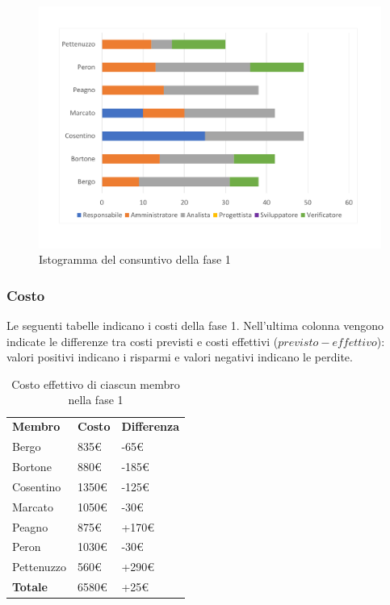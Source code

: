 	\begin{figure}[H]
		\centering
		\includegraphics[scale=0.45]{images/consuntivoRR.pdf}
		\caption{Istogramma del consuntivo della fase 1}
	\end{figure}
	
	\subsubsection{Costo}
	Le seguenti tabelle indicano i costi della fase 1. Nell'ultima colonna vengono indicate le differenze tra costi previsti e costi effettivi ($previsto - effettivo$): valori positivi indicano i risparmi e valori negativi indicano le perdite.
	
	\begin{table}[H]
		\centering
		\begin{tabular}{| l | l | l |}
			\rowcolor{LightBlue}
			\textbf{\color{white}Membro}
			& \textbf{\color{white}Costo}
			& \textbf{\color{white}Differenza}\\			
			Bergo 				& 835€ 	& -65€\\
			Bortone 			& 880€ 	& -185€\\
			Cosentino 		& 1350€ 	& -125€\\
			Marcato 			& 1050€ 	& -30€\\
			Peagno 			& 875€ 	& +170€\\
			Peron 				& 1030€ 	& -30€\\
			Pettenuzzo 	& 560€ 	& +290€\\ \hline
			\textbf{Totale} & 6580€ & +25€\\ \hline
		\end{tabular}
		\caption{Costo effettivo di ciascun membro nella fase 1}	
	\end{table}

